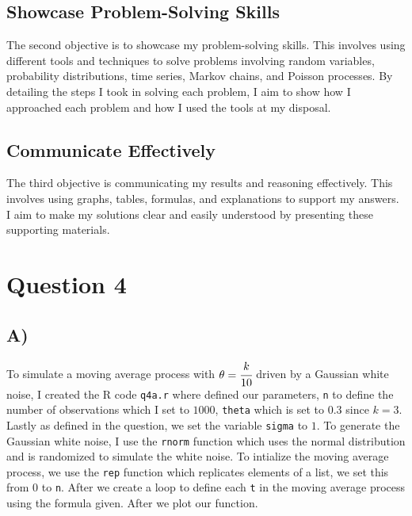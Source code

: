 \documentclass[11pt, letterpaper]{article}
\begin{document}
\subsection{Showcase Problem-Solving Skills}
The second objective is to showcase my problem-solving skills. This involves
using different tools and techniques to solve problems involving random
variables, probability distributions, time series, Markov chains, and Poisson
processes. By detailing the steps I took in solving each problem, I aim to show
how I approached each problem and how I used the tools at my disposal.

\subsection{Communicate Effectively}
The third objective is communicating my results and reasoning effectively. This
involves using graphs, tables, formulas, and explanations to support my
answers. I aim to make my solutions clear and easily understood by presenting
these supporting materials.

\newpage







\newpage
\section*{Question 4}
\subsection*{A)}
To simulate a moving average process with $\theta = \cfrac{k}{10}$ driven by a
Gaussian
white noise, I created the R code \verb|q4a.r| where defined our parameters,
\verb|n| to define the number
of observations which I set to $1000$, \verb|theta| which is set to $0.3$ since
$k=3$. Lastly as defined
in the question, we set the variable \verb|sigma| to $1$. To generate the
Gaussian white noise, I use the
\verb|rnorm| function which uses the normal distribution and is randomized to
simulate the white noise. To intialize
the moving average process, we use the \verb|rep| function which replicates
elements of a list, we set this from $0$ to \verb|n|.
After we create a loop to define each \verb|t| in the moving average process
using the formula given. After
we plot our function.
\end{document}
